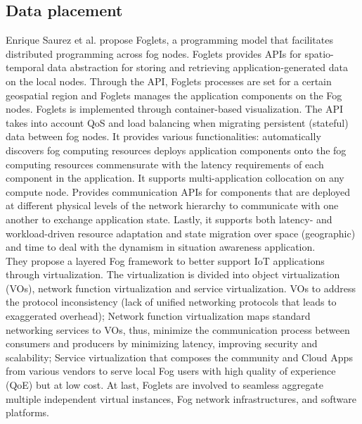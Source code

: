 
\subsection{Data placement}
\label{sec:Dataplacement}

\cite{saurez2016incremental}
Enrique Saurez et al. propose Foglets, a programming model that facilitates distributed programming across fog nodes. Foglets provides APIs for spatio-temporal data abstraction for storing and retrieving application-generated data on the local nodes. Through the API, Foglets processes are set for a certain geospatial region and Foglets manages the application components on the Fog nodes. Foglets is implemented through container-based visualization. The API takes into account QoS and load balancing when migrating persistent (stateful) data between fog nodes. It provides various functionalities: automatically discovers fog computing resources deploys application components onto the fog computing resources commensurate with the latency requirements of each component in the application. It supports multi-application collocation on any compute node. Provides communication APIs for components that are deployed at different physical levels of the network hierarchy to communicate with one another to exchange application state. Lastly, it supports both latency- and workload-driven resource adaptation and state migration over space (geographic) and time to deal with the dynamism in situation awareness application.\\

\cite{li2018virtual}
They propose a layered Fog framework to better support IoT applications through virtualization. The virtualization is divided into object virtualization  (VOs), network function virtualization and service virtualization. VOs to address the protocol inconsistency (lack of unified networking protocols that leads to exaggerated overhead); Network function virtualization maps standard networking services to VOs, thus, minimize the communication process between consumers and producers by minimizing latency, improving security and scalability; Service virtualization that composes the community and Cloud Apps from various vendors to serve local Fog users with high quality of experience (QoE) but at low cost. At last, Foglets are involved to seamless aggregate multiple independent virtual instances, Fog network infrastructures, and software platforms.\\

